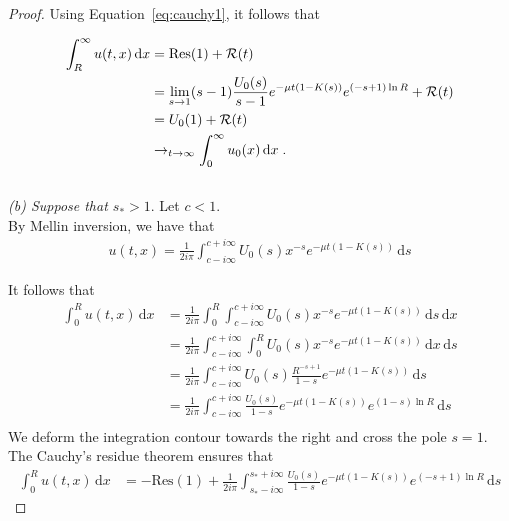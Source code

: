 \documentclass[11pt]{amsart}
\newcommand{\diff}{\,\mathrm{d}}
\begin{document}
\begin{proof}
            Using Equation~\ref{eq:cauchy1}, it follows that 
            
            \begin{align*}
                \int_R^\infty u(t,x) \diff x &= \mathrm{Res(1)} + \Rcal(t) \\
                &= \lim_{s \to 1} (s-1)\frac{U_0(s)}{s-1} e^{-\mu t(1 - K(s))} e^{(-s+1)\ln R}  + \Rcal(t)\\
                &= U_0(1) + \Rcal(t)\\
                &\to_{t \to \infty} \int_0^\infty u_0(x) \diff x
                \eqfinp
            \end{align*}\\
            
            \textit{(b) Suppose that $s_* > 1$}. Let $c<1$. \\
            By Mellin inversion, we have that
            \begin{align*}
                u(t,x) = \frac{1}{2i\pi}\int_{c-i\infty}^{c+i\infty} U_0(s) x^{-s} e^{-\mu t(1 - K(s))} \diff s
            \end{align*}
            
            It follows that
            \begin{align*}
                \int_0^R u(t,x) \diff x 
                &= \frac{1}{2i\pi} \int_0^R \int_{c-i\infty}^{c+i\infty} U_0(s) x^{-s} e^{-\mu t(1 - K(s))} \diff s \diff x \\
                &= \frac{1}{2i\pi} \int_{c-i\infty}^{c+i\infty} \int_0^R U_0(s) x^{-s} e^{-\mu t(1 - K(s))} \diff x \diff s \\
                &= \frac{1}{2i\pi} \int_{c-i\infty}^{c+i\infty} U_0(s) \frac{R^{-s+1}}{1-s} e^{-\mu t(1 - K(s))} \diff s \\
                &= \frac{1}{2i\pi} \int_{c-i\infty}^{c+i\infty} \frac{U_0(s)}{1-s} e^{-\mu t(1 - K(s))} e^{(1-s)\ln R} \diff s \\
            \end{align*}
            We deform the integration contour towards the right and cross the pole $s = 1$. The Cauchy's residue theorem ensures that
            \begin{align}
                \int_0^R u(t,x) \diff x &= -\mathrm{Res(1)} + \frac{1}{2i\pi} \int_{s_*-i\infty}^{s_*+i\infty} \frac{U_0(s)}{1-s} e^{-\mu t(1 - K(s))} e^{(-s+1)\ln R} \diff s
                \label{eq:cauchy3}
            \end{align}
            

\end{proof}
\end{document}
